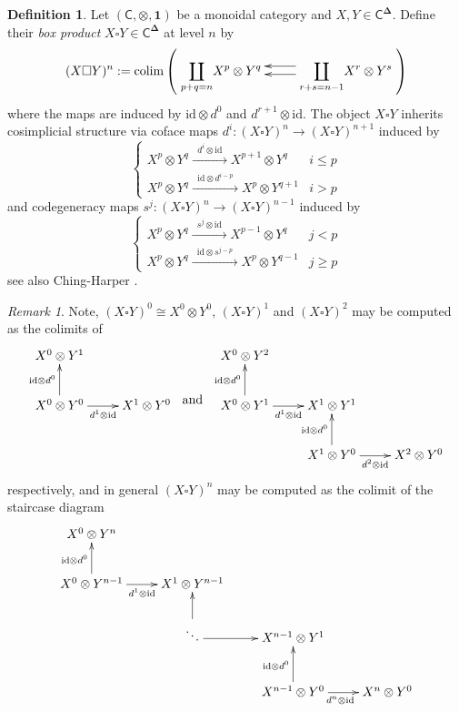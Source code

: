 \documentclass[11pt]{amsart}
\theoremstyle{definition}
\newtheorem{definition}[subsection]{Definition}
\theoremstyle{remark}
\newtheorem{remark}[subsection]{Remark}
\newcommand{\colim}{\operatorname{colim}}
\newcommand{\id}{\mathrm{id}}
\newcommand{\bdel}{\mathbf{\Delta}}
\begin{document}
\begin{definition} \label{def:box-product} 
Let $(\mathsf{C}, \otimes, \mathbf{1})$ be a monoidal category and $X,Y\in \textsf{C}^{\bdel}$. Define their \textit{box product} $X\square Y\in \textsf{C}^{\bdel}$ at level $n$ by \[
(X\square Y)^n:=
\colim \left( \xymatrix{ 
    \displaystyle{\coprod_{p+q=n}} X^{p}\otimes Y^{q} & 
    \ar@<-1 ex>[l] \ar@<.5 ex>[l] 
    \displaystyle{\coprod_{r+s=n-1}} X^{r}\otimes Y^{s} 
}\right) \]
where the maps are induced by $\id\otimes d^0$ and $d^{r+1}\otimes \id$. The object $X\square Y$ inherits cosimplicial structure via coface maps $d^i\colon (X\square Y)^{n}\to (X\square Y)^{n+1}$ induced by
\[\begin{cases} 
X^p\otimes Y^q \xrightarrow{\;\; d^i\otimes \id\;\;} X^{p+1}\otimes Y^{q} & i \leq p
\\
X^p\otimes Y^q \xrightarrow{\;\; \id \otimes d^{i-p} \;\;} X^{p}\otimes Y^{q+1} & i > p
\end{cases}
\]
and codegeneracy maps $s^j\colon (X\square Y)^n \to (X\square Y)^{n-1}$ induced by
\[\begin{cases} 
X^p\otimes Y^q \xrightarrow{\;\; s^j\otimes \id\;\;} X^{p-1}\otimes Y^{q} & j < p
\\
X^p\otimes Y^q \xrightarrow{\;\; \id \otimes s^{j-p} \;\;} X^{p}\otimes Y^{q-1} & j \geq p
\end{cases}
\]
see also Ching-Harper \cite[]{Ching-Harper-Koszul}.
\end{definition}

\begin{remark}Note, $(X\square Y)^0\cong X^0\otimes Y^0$, $(X\square Y)^{1}$ and $(X\square Y)^{2}$ may be computed as the colimits of \[ \xymatrix{ X^0 \otimes Y^1 & \\ X^0 \otimes Y^0 \ar[r]_-{d^1\otimes \id} \ar[u]^-{\id \otimes d^0} & X^1 \otimes Y^0} \; \raisebox{-8ex}{\text{ and }}  \; \xymatrix{ 
    X^0 \otimes Y^2 & &
    \\ 
    X^0 \otimes Y^1 \ar[r]_-{d^1\otimes \id} \ar[u]^-{\id \otimes d^0} 
    & 
    X^1 \otimes Y^1 & \\
    & X^1 \otimes Y^0 \ar[u]^-{\id \otimes d^0} \ar[r]_-{d^2\otimes \id} 
    &
    X^2 \otimes Y^0}
    \] respectively, and in general $(X\square Y)^n$ may be computed as the colimit of the staircase diagram \begin{equation}\xymatrix{
    X^0 \otimes Y^n & &\\
    X^0 \otimes Y^{n-1} \ar[r]_{d^1\otimes \id} \ar[u]^{\id\otimes d^0} & X^1 \otimes Y^{n-1} &\\
    & \ddots \ar[u] \ar[r]& X^{n-1}\otimes Y^1 &\\
    && X^{n-1}\otimes Y^0 \ar[u]^{\id\otimes d^0} \ar[r]_{d^n\otimes \id} &X^n\otimes Y^0 
}\end{equation}
\end{remark}
\end{document}
